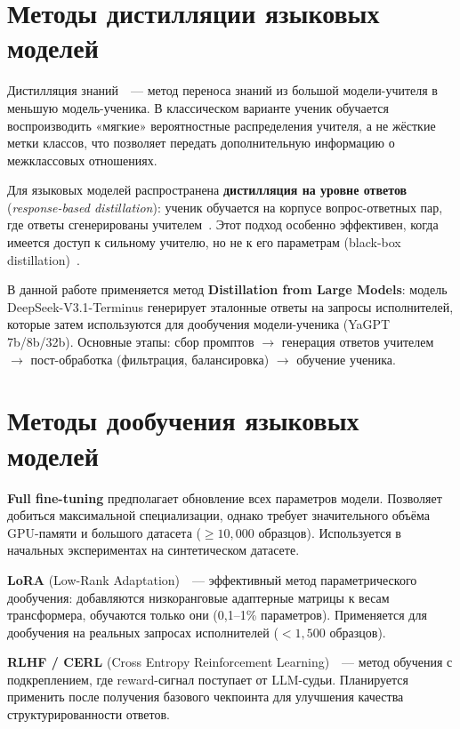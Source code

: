 \documentclass[times]{itmo-student-thesis}
\begin{document}
\section{Методы дистилляции языковых моделей}

Дистилляция знаний~\cite{hinton2015distilling}~--- метод переноса знаний
из большой модели-учителя в меньшую модель-ученика. В классическом
варианте ученик обучается воспроизводить «мягкие» вероятностные
распределения учителя, а не жёсткие метки классов, что позволяет передать
дополнительную информацию о межклассовых отношениях.

Для языковых моделей распространена \textbf{дистилляция на уровне ответов}
(\emph{response-based distillation}): ученик обучается на корпусе
вопрос-ответных пар, где ответы сгенерированы учителем~\cite{sanh2019distilbert}.
Этот подход особенно эффективен, когда имеется доступ к сильному учителю,
но не к его параметрам (black-box distillation)~\cite{distiller-nlp}.

В данной работе применяется метод \textbf{Distillation from Large Models}:
модель DeepSeek-V3.1-Terminus генерирует эталонные ответы на запросы
исполнителей, которые затем используются для дообучения модели-ученика
(YaGPT 7b/8b/32b). Основные этапы: сбор промптов $\to$ генерация ответов
учителем $\to$ пост-обработка (фильтрация, балансировка) $\to$ обучение ученика.

\section{Методы дообучения языковых моделей}

\textbf{Full fine-tuning} предполагает обновление всех параметров модели.
Позволяет добиться максимальной специализации, однако требует значительного
объёма GPU-памяти и большого датасета ($\ge 10{,}000$ образцов).
Используется в начальных экспериментах на синтетическом датасете.

\textbf{LoRA} (Low-Rank Adaptation)~\cite{hu2022lora}~--- эффективный метод
параметрического дообучения: добавляются низкоранговые адаптерные матрицы
к весам трансформера, обучаются только они (0{,}1–1\% параметров).
Применяется для дообучения на реальных запросах исполнителей ($<1{,}500$ образцов).

\textbf{RLHF / CERL} (Cross Entropy Reinforcement Learning)~\cite{ouyang2022instructgpt, schulman2017ppo}~---
метод обучения с подкреплением, где reward-сигнал поступает от LLM-судьи.
Планируется применить после получения базового чекпоинта для улучшения
качества структурированности ответов.
\end{document}
